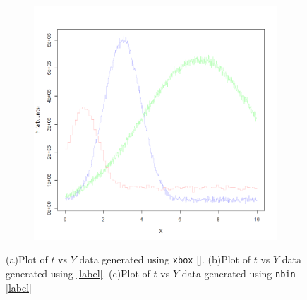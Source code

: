 \documentclass{article}
\begin{document}
\begin{figure}[h]
\begin{subfigure}[t]{0.32\textwidth}
		\label{F3b}
	\end{subfigure}
	\hfill
	\begin{subfigure}[t]{0.32\textwidth}
		\centering
		\includegraphics[width=\linewidth]{Proof_Concept_noisy_list_nbin.png}
		\label{F3c}
	\end{subfigure}	
	\caption{(a)Plot of $t$ vs $Y$ data generated using \lstinline[language=R]|xbox| \ref{}. (b)Plot of $t$ vs $Y$ data generated using \ref{label}. (c)Plot of $t$ vs $Y$ data generated using \lstinline[language=R]|nbin| \ref{label}}\label{F3}
\end{figure}
\end{document}
